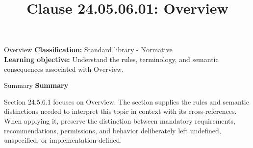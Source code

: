 \documentclass[10pt,letterpaper]{article}
\title{Clause 24.05.06.01: Overview}
\author{}
\date{}
\begin{document}
\maketitle
\begin{CornellOverviewBox}{Overview}
\textbf{Classification:} Standard library - Normative\\[2pt]
\textbf{Learning objective:} Understand the rules, terminology, and semantic consequences associated with Overview.
\end{CornellOverviewBox}\begin{CornellSummaryBox}{Summary}
{\sffamily\bfseries\color{Accent} Summary}\par\vspace{3pt}Section 24.5.6.1 focuses on Overview. The section supplies the rules and semantic distinctions needed to interpret this topic in context with its cross-references. When applying it, preserve the distinction between mandatory requirements, recommendations, permissions, and behavior deliberately left undefined, unspecified, or implementation-defined.
\end{CornellSummaryBox}
\end{document}
